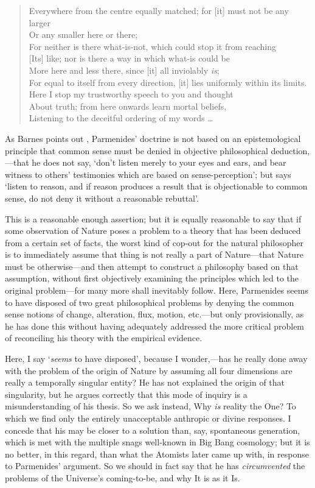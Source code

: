 \begin{quotation}
Everywhere from the centre equally matched; for [it] must not be any larger\\
Or any smaller here or there;\\
For neither is there what-is-not, which could stop it from reaching\\ 
\hspace{0pt}[Its] like; nor is there a way in which what-is could be\\
More here and less there, since [it] all inviolably \textit{is};\\
For equal to itself from every direction, [it] lies uniformly within its limits.\\
Here I stop my trustworthy speech to you and thought\\
About truth; from here onwards learn mortal beliefs,\\
Listening to the deceitful ordering of my words \ldots
\end{quotation}

As Barnes points out \cite{Barnes1982}, Parmenides' doctrine is not based on an epistemological principle that common sense must be denied in objective philosophical deduction,---that he does not say, `don't listen merely to your eyes and ears, and bear witness to others' testimonies which are based on sense-perception'; but says `listen to reason, and if reason produces a result that is objectionable to common sense, do not deny it without a reasonable rebuttal'.

This is a reasonable enough assertion; but it is equally reasonable to say that if some observation of Nature poses a problem to a theory that has been deduced from a certain set of facts, the worst kind of cop-out for the natural philosopher is to immediately assume that thing is not really a part of Nature---that Nature must be otherwise---and then attempt to construct a philosophy based on that assumption, without first objectively examining the principles which led to the original problem---for many more shall inevitably follow. Here, Parmenides seems to have disposed of two great philosophical problems by denying the common sense notions of change, alteration, flux, motion, etc.---but only provisionally, as he has done this without having adequately addressed the more critical problem of reconciling his theory with the empirical evidence. 

Here, I say `\textit{seems} to have disposed', because I wonder,---has he really done away with the problem of the origin of Nature by assuming all four dimensions are really a temporally singular entity? He has not explained the origin of that singularity, but he argues correctly that this mode of inquiry is a misunderstanding of his thesis. So we ask instead, Why \textit{is} reality the One? To which we find only the entirely unacceptable anthropic or divine responses. I concede that his may be closer to a solution than, say, spontaneous generation, which is met with the multiple snags well-known in Big Bang cosmology; but it is no better, in this regard, than what the Atomists later came up with, in response to Parmenides' argument. So we should in fact say that he has \textit{circumvented} the problems of the Universe's coming-to-be, and why It is as it Is.

